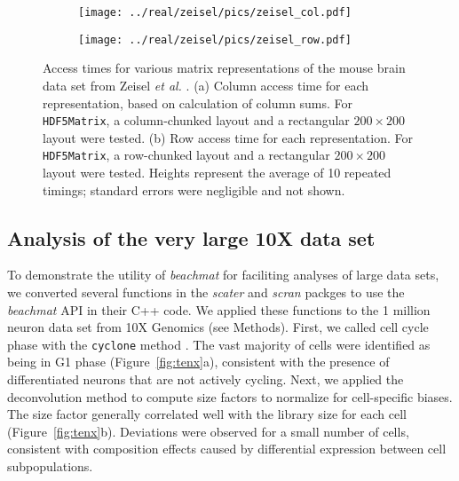 \documentclass[10pt,letterpaper]{article}
\newcommand{\beachmat}{\textit{beachmat}}
\newcommand{\code}[1]{\texttt{#1}}
\begin{document}
\begin{figure}[bt]
    \begin{subfigure}[b]{0.49\textwidth}
        \texttt{[image: ../real/zeisel/pics/zeisel\_col.pdf]}
        \caption{}
    \end{subfigure}
    \begin{subfigure}[b]{0.49\textwidth}
        \texttt{[image: ../real/zeisel/pics/zeisel\_row.pdf]}
        \caption{}
    \end{subfigure}
    \caption{Access times for various matrix representations of the mouse brain data set from Zeisel \textit{et al.} \cite{zeisel2015brain}.
        (a) Column access time for each representation, based on calculation of column sums.
        For \code{HDF5Matrix}, a column-chunked layout and a rectangular $200 \times 200$ layout were tested.
        (b) Row access time for each representation.
        For \code{HDF5Matrix}, a row-chunked layout and a rectangular $200 \times 200$ layout were tested.
        Heights represent the average of 10 repeated timings; standard errors were negligible and not shown.
    }
    \label{fig:zeisel}
\end{figure}

\subsection*{Analysis of the very large 10X data set}
To demonstrate the utility of \beachmat{} for faciliting analyses of large data sets, we converted several functions in the \textit{scater} \cite{mccarthy2017scater} and \textit{scran} packges \cite{lun2016stepbystep} to use the \beachmat{} API in their C++ code.
We applied these functions to the 1 million neuron data set from 10X Genomics (see Methods).
First, we called cell cycle phase with the \code{cyclone} method \cite{scialdone2015computational}. 
The vast majority of cells were identified as being in G1 phase (Figure~\ref{fig:tenx}a), consistent with the presence of differentiated neurons that are not actively cycling.
Next, we applied the deconvolution method \cite{lun2016pooling} to compute size factors to normalize for cell-specific biases.
The size factor generally correlated well with the library size for each cell (Figure~\ref{fig:tenx}b).
Deviations were observed for a small number of cells, consistent with composition effects \cite{robinson2010scaling} caused by differential expression between cell subpopulations.
\end{document}
